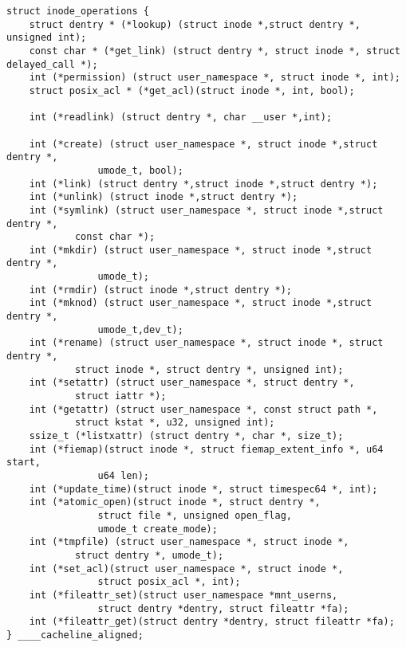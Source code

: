 
\begin{lstlisting}
struct inode_operations {
    struct dentry * (*lookup) (struct inode *,struct dentry *, unsigned int);
    const char * (*get_link) (struct dentry *, struct inode *, struct delayed_call *);
    int (*permission) (struct user_namespace *, struct inode *, int);
    struct posix_acl * (*get_acl)(struct inode *, int, bool);

    int (*readlink) (struct dentry *, char __user *,int);

    int (*create) (struct user_namespace *, struct inode *,struct dentry *,
                umode_t, bool);
    int (*link) (struct dentry *,struct inode *,struct dentry *);
    int (*unlink) (struct inode *,struct dentry *);
    int (*symlink) (struct user_namespace *, struct inode *,struct dentry *,
            const char *);
    int (*mkdir) (struct user_namespace *, struct inode *,struct dentry *,
                umode_t);
    int (*rmdir) (struct inode *,struct dentry *);
    int (*mknod) (struct user_namespace *, struct inode *,struct dentry *,
                umode_t,dev_t);
    int (*rename) (struct user_namespace *, struct inode *, struct dentry *,
            struct inode *, struct dentry *, unsigned int);
    int (*setattr) (struct user_namespace *, struct dentry *,
            struct iattr *);
    int (*getattr) (struct user_namespace *, const struct path *,
            struct kstat *, u32, unsigned int);
    ssize_t (*listxattr) (struct dentry *, char *, size_t);
    int (*fiemap)(struct inode *, struct fiemap_extent_info *, u64 start,
                u64 len);
    int (*update_time)(struct inode *, struct timespec64 *, int);
    int (*atomic_open)(struct inode *, struct dentry *,
                struct file *, unsigned open_flag,
                umode_t create_mode);
    int (*tmpfile) (struct user_namespace *, struct inode *,
            struct dentry *, umode_t);
    int (*set_acl)(struct user_namespace *, struct inode *,
                struct posix_acl *, int);
    int (*fileattr_set)(struct user_namespace *mnt_userns,
                struct dentry *dentry, struct fileattr *fa);
    int (*fileattr_get)(struct dentry *dentry, struct fileattr *fa);
} ____cacheline_aligned;
\end{lstlisting}
